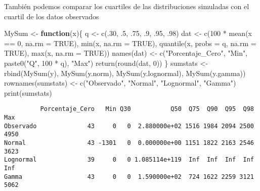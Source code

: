 \documentclass[
  letterpaper,
  DIV=11,
  numbers=noendperiod]{scrreprt}
\newenvironment{Shaded}{\begin{snugshade}}{\end{snugshade}}
\newcommand{\AttributeTok}[1]{\textcolor[rgb]{0.40,0.45,0.13}{#1}}
\newcommand{\ConstantTok}[1]{\textcolor[rgb]{0.56,0.35,0.01}{#1}}
\newcommand{\ControlFlowTok}[1]{\textcolor[rgb]{0.00,0.23,0.31}{\textbf{#1}}}
\newcommand{\DecValTok}[1]{\textcolor[rgb]{0.68,0.00,0.00}{#1}}
\newcommand{\FunctionTok}[1]{\textcolor[rgb]{0.28,0.35,0.67}{#1}}
\newcommand{\NormalTok}[1]{\textcolor[rgb]{0.00,0.23,0.31}{#1}}
\newcommand{\OtherTok}[1]{\textcolor[rgb]{0.00,0.23,0.31}{#1}}
\newcommand{\SpecialCharTok}[1]{\textcolor[rgb]{0.37,0.37,0.37}{#1}}
\newcommand{\StringTok}[1]{\textcolor[rgb]{0.13,0.47,0.30}{#1}}
\begin{document}
También podemos comparar los cuartiles de las distribuciones simuladas
con el cuartil de los datos observados

\begin{Shaded}
\begin{Highlighting}[]
\NormalTok{MySum }\OtherTok{\textless{}{-}} \ControlFlowTok{function}\NormalTok{(x)\{}
\NormalTok{  q }\OtherTok{\textless{}{-}} \FunctionTok{c}\NormalTok{(.}\DecValTok{30}\NormalTok{, .}\DecValTok{5}\NormalTok{, .}\DecValTok{75}\NormalTok{, .}\DecValTok{9}\NormalTok{, .}\DecValTok{95}\NormalTok{, .}\DecValTok{98}\NormalTok{)}
\NormalTok{  dat }\OtherTok{\textless{}{-}} \FunctionTok{c}\NormalTok{(}\DecValTok{100} \SpecialCharTok{*} \FunctionTok{mean}\NormalTok{(x }\SpecialCharTok{==} \DecValTok{0}\NormalTok{, }\AttributeTok{na.rm =} \ConstantTok{TRUE}\NormalTok{),}
           \FunctionTok{min}\NormalTok{(x, }\AttributeTok{na.rm =} \ConstantTok{TRUE}\NormalTok{), }\FunctionTok{quantile}\NormalTok{(x, }\AttributeTok{probs =}\NormalTok{ q, }\AttributeTok{na.rm =} \ConstantTok{TRUE}\NormalTok{), }
           \FunctionTok{max}\NormalTok{(x, }\AttributeTok{na.rm =} \ConstantTok{TRUE}\NormalTok{))}
  \FunctionTok{names}\NormalTok{(dat) }\OtherTok{\textless{}{-}} \FunctionTok{c}\NormalTok{(}\StringTok{"Porcentaje\_Cero"}\NormalTok{, }\StringTok{"Min"}\NormalTok{, }\FunctionTok{paste0}\NormalTok{(}\StringTok{"Q"}\NormalTok{, }\DecValTok{100} \SpecialCharTok{*}\NormalTok{ q), }\StringTok{"Max"}\NormalTok{)}
  \FunctionTok{return}\NormalTok{(}\FunctionTok{round}\NormalTok{(dat, }\DecValTok{0}\NormalTok{))}
\NormalTok{\} }
\NormalTok{sumstats }\OtherTok{\textless{}{-}} \FunctionTok{rbind}\NormalTok{(}\FunctionTok{MySum}\NormalTok{(y), }\FunctionTok{MySum}\NormalTok{(y.norm), }
                  \FunctionTok{MySum}\NormalTok{(y.lognormal), }\FunctionTok{MySum}\NormalTok{(y.gamma))}
\FunctionTok{rownames}\NormalTok{(sumstats) }\OtherTok{\textless{}{-}} \FunctionTok{c}\NormalTok{(}\StringTok{"Observado"}\NormalTok{, }\StringTok{"Normal"}\NormalTok{, }\StringTok{"Lognormal"}\NormalTok{, }\StringTok{"Gamma"}\NormalTok{)}
\FunctionTok{print}\NormalTok{(sumstats)}
\end{Highlighting}
\end{Shaded}

\begin{verbatim}
          Porcentaje_Cero   Min Q30           Q50  Q75  Q90  Q95  Q98  Max
Observado              43     0   0  2.880000e+02 1516 1984 2094 2500 4950
Normal                 43 -1301   0  0.000000e+00 1151 1822 2163 2546 3623
Lognormal              39     0   0 1.085114e+119  Inf  Inf  Inf  Inf  Inf
Gamma                  43     0   0  1.590000e+02  724 1622 2259 3121 5062
\end{verbatim}
\end{document}
